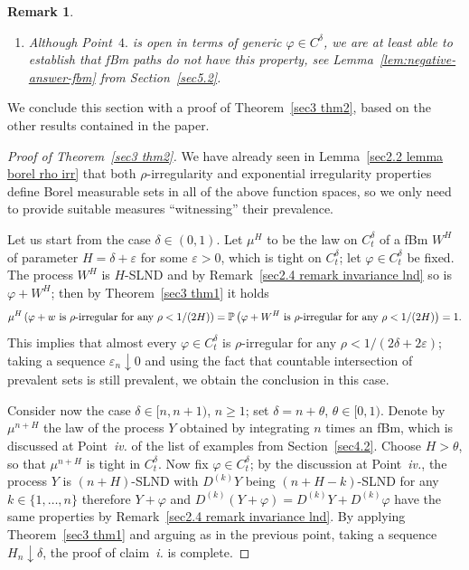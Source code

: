 \documentclass[10pt]{article}
\newcommand{\tmtextit}[1]{{\itshape{#1}}}
\newtheorem{remark}[theorem]{Remark}
\begin{document}
\begin{remark}
\begin{enumerate}[label=\arabic*.]
    \item Although Point~$4.$ is open in terms of generic $\varphi \in
    C^{\delta}$, we are at least able to establish that fBm paths do not have
    this property, see Lemma~\ref{lem:negative-answer-fbm} from
    Section~\ref{sec5.2}.
  \end{enumerate}
\end{remark}

We conclude this section with a proof of Theorem~\ref{sec3 thm2}, based on the
other results contained in the paper.

\begin{proof}[Proof of Theorem~\ref{sec3 thm2}]
  We have already seen in Lemma~\ref{sec2.2 lemma borel rho irr} that both
  $\rho$\mbox{-}irregularity and exponential irregularity properties define
  Borel measurable sets in all of the above function spaces, so we only need
  to provide suitable measures ``witnessing'' their prevalence.
  
  Let us start from the case $\delta \in (0, 1)$. Let $\mu^H$ to be the law on
  $C^{\delta}_t$ of a fBm $W^H$ of parameter $H = \delta + \varepsilon$ for
  some $\varepsilon > 0$, which is tight on $C^{\delta}_t$; let $\varphi \in
  C^{\delta}_t$ be fixed. The process $W^H$ is $H$\mbox{-}SLND and by
  Remark~\ref{sec2.4 remark invariance lnd} so is $\varphi + W^H$; then by
  Theorem~\ref{sec3 thm1} it holds
  \[ \mu^H \left( \varphi + w \text{ is $\rho$\mbox{-}irregular for any } \rho
     < 1 / (2 H) \right) =\mathbb{P} \left( \varphi + W^H \text{ is
     $\rho$\mbox{-}irregular for any } \rho < 1 / (2 H) \right) = 1. \]
  This implies that almost every $\varphi \in C^{\delta}_t$ is
  $\rho$\mbox{-}irregular for any $\rho < 1 / (2 \delta + 2 \varepsilon)$;
  taking a sequence $\varepsilon_n \downarrow 0$ and using the fact that
  countable intersection of prevalent sets is still prevalent, we obtain the
  conclusion in this case.
  
  Consider now the case $\delta \in [n, n + 1)$, $n \geqslant 1$; set $\delta
  = n + \theta$, $\theta \in [0, 1)$. Denote by $\mu^{n + H}$ the law of the
  process $Y$ obtained by integrating $n$ times an fBm, which is discussed at
  Point~\tmtextit{iv.} of the list of examples from Section~\ref{sec4.2}.
  Choose $H > \theta$, so that $\mu^{n + H}$ is tight in $C^{\delta}_t$. Now
  fix $\varphi \in C^{\delta}_t$; by the discussion at Point~\tmtextit{iv.},
  the process $Y$ is $(n + H)$\mbox{-}SLND with $D^{(k)} Y$ being $(n + H -
  k)$\mbox{-}SLND for any $k \in \{ 1, \ldots, n \}$ therefore $Y + \varphi$
  and $D^{(k)} (Y + \varphi) = D^{(k)} Y + D^{(k)} \varphi$ have the same
  properties by Remark~\ref{sec2.4 remark invariance lnd}. By applying
  Theorem~\ref{sec3 thm1} and arguing as in the previous point, taking a
  sequence $H_n \downarrow \delta$, the proof of claim~\tmtextit{i.} is
  complete.
  

\end{proof}
\end{document}
